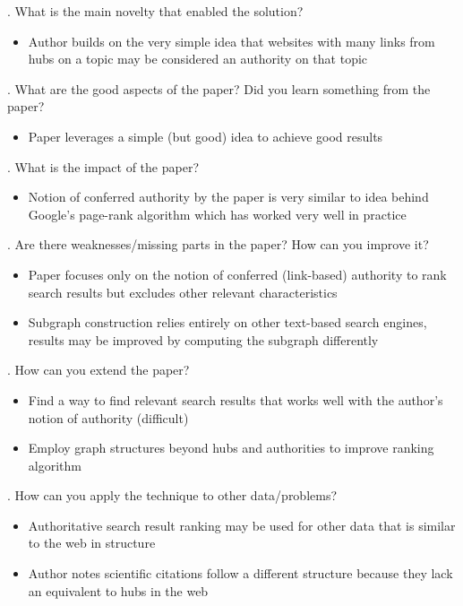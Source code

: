 \documentclass[12pt]{article}
\begin{document}
. What is the main novelty that enabled the solution?

\begin{itemize}
    \item Author builds on the very simple idea that websites with many links from hubs on a topic may be considered an authority on that topic
\end{itemize}

. What are the good aspects of the paper? Did you learn something from the paper?

\begin{itemize}
    \item Paper leverages a simple (but good) idea to achieve good results
\end{itemize}

. What is the impact of the paper?

\begin{itemize}
    \item Notion of conferred authority by the paper is very similar to idea behind Google's page-rank algorithm which has worked very well in practice
\end{itemize}

. Are there weaknesses/missing parts in the paper? How can you improve it?

\begin{itemize}
    \item Paper focuses only on the notion of conferred (link-based) authority to rank search results but excludes other relevant characteristics
    \item Subgraph construction relies entirely on other text-based search engines, results may be improved by computing the subgraph differently
\end{itemize}

. How can you extend the paper?

\begin{itemize}
    \item Find a way to find relevant search results that works well with the author's notion of authority (difficult)
    \item Employ graph structures beyond hubs and authorities to improve ranking algorithm
\end{itemize}

. How can you apply the technique to other data/problems?

\begin{itemize}
    \item Authoritative search result ranking may be used for other data that is similar to the web in structure
    \item Author notes scientific citations follow a different structure because they lack an equivalent to hubs in the web
\end{itemize}
\end{document}
